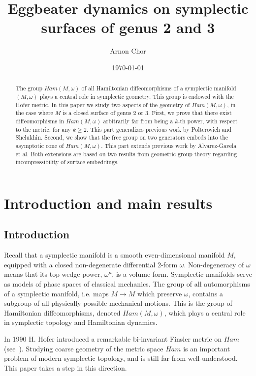 \documentclass[11pt]{article}
\title{Eggbeater dynamics on symplectic surfaces of genus 2 and 3}
\date{\today}
\author{Arnon Chor}
\begin{document}
\maketitle
\thispagestyle{empty}

\begin{abstract}
    The group $Ham(M,\omega)$ of all Hamiltonian diffeomorphisms of a symplectic manifold $(M,\omega)$ plays a central role in symplectic geometry. This group is endowed with the Hofer metric. In this paper we study two aspects of the geometry of $Ham(M,\omega)$, in the case where $M$ is a closed surface of genus 2 or 3. First, we prove that there exist diffeomorphisms in $Ham(M,\omega)$ arbitrarily far from being a $k$-th power, with respect to the metric, for any $k \geq 2$. This part generalizes previous work by Polterovich and Shelukhin. Second, we show that the free group on two generators embeds into the asymptotic cone of $Ham(M,\omega)$. This part extends previous work by Alvarez-Gavela et al. Both extensions are based on two results from geometric group theory regarding incompressibility of surface embeddings.
\end{abstract}

\section{Introduction and main results}
    \subsection{Introduction}
        Recall that a symplectic manifold is a smooth even-dimensional manifold $M$, equipped with a closed non-degenerate differential 2-form $\omega$. Non-degeneracy of $\omega$ means that its top wedge power, $\omega^n$, is a volume form. Symplectic manifolds serve as models of phase spaces of classical mechanics. The group of all automorphisms of a symplectic manifold, i.e. maps $M \to M$ which preserve $\omega$, contains a subgroup of all physically possible mechanical motions. This is the group of Hamiltonian diffeomorphisms, denoted $Ham(M,\omega)$, which plays a central role in symplectic topology and Hamiltonian dynamics.
        
        In 1990 H. Hofer introduced a remarkable bi-invariant Finsler metric on $Ham$ (see~\cite{H}). Studying coarse geometry of the metric space $Ham$ is an important problem of modern symplectic topology, and is still far from well-understood. This paper takes a step in this direction.
        
\end{document}

